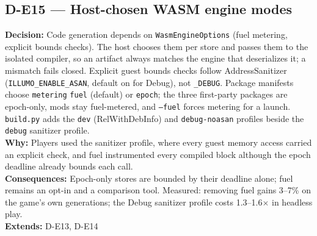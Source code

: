 \subsection*{D-E15 --- Host-chosen WASM engine modes}
\begin{decisionbox}[title={D-E15 \quad 2026-09-22}]
\textbf{Decision:} Code generation depends on \texttt{WasmEngineOptions}
(fuel metering, explicit bounds checks). The host chooses them per store and
passes them to the isolated compiler, so an artifact always matches the engine
that deserializes it; a mismatch fails closed. Explicit guest bounds checks
follow AddressSanitizer (\texttt{ILLUMO\_ENABLE\_ASAN}, default on for Debug),
not \texttt{\_DEBUG}. Package manifests choose \texttt{metering}
\texttt{fuel} (default) or \texttt{epoch}; the three first-party packages are
epoch-only, mods stay fuel-metered, and \texttt{--fuel} forces metering for a
launch. \texttt{build.py} adds the \texttt{dev} (RelWithDebInfo) and
\texttt{debug-noasan} profiles beside the \texttt{debug} sanitizer profile.\\
\textbf{Why:} Players used the sanitizer profile, where every guest memory
access carried an explicit check, and fuel instrumented every compiled block
although the epoch deadline already bounds each call.\\
\textbf{Consequences:} Epoch-only stores are bounded by their deadline alone;
fuel remains an opt-in and a comparison tool. Measured: removing fuel gains
3--7\% on the game's own generations; the Debug sanitizer profile costs
1.3--1.6$\times$ in headless play.\\
\textbf{Extends:} D-E13, D-E14
\end{decisionbox}

